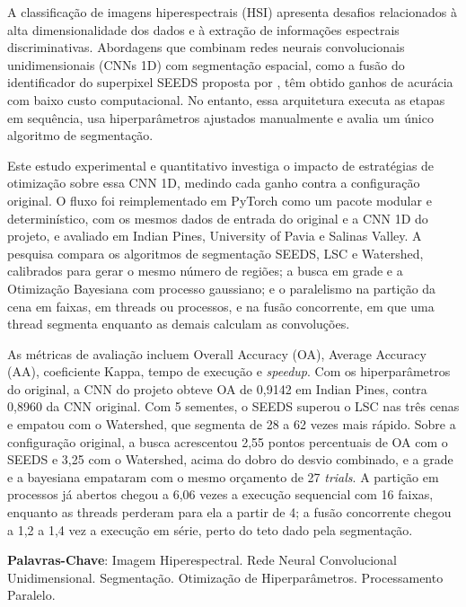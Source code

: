 \begin{Resumo}
A classificação de imagens hiperespectrais (HSI) apresenta desafios relacionados à alta dimensionalidade dos dados e à extração de informações espectrais discriminativas. Abordagens que combinam redes neurais convolucionais unidimensionais (CNNs 1D) com segmentação espacial, como a fusão do identificador do superpixel SEEDS proposta por , têm obtido ganhos de acurácia com baixo custo computacional. No entanto, essa arquitetura executa as etapas em sequência, usa hiperparâmetros ajustados manualmente e avalia um único algoritmo de segmentação.

Este estudo experimental e quantitativo investiga o impacto de estratégias de otimização sobre essa CNN 1D, medindo cada ganho contra a configuração original. O fluxo foi reimplementado em PyTorch como um pacote modular e determinístico, com os mesmos dados de entrada do original e a CNN 1D do projeto, e avaliado em Indian Pines, University of Pavia e Salinas Valley. A pesquisa compara os algoritmos de segmentação SEEDS, LSC e Watershed, calibrados para gerar o mesmo número de regiões; a busca em grade e a Otimização Bayesiana com processo gaussiano; e o paralelismo na partição da cena em faixas, em threads ou processos, e na fusão concorrente, em que uma thread segmenta enquanto as demais calculam as convoluções.

As métricas de avaliação incluem Overall Accuracy (OA), Average Accuracy (AA), coeficiente Kappa, tempo de execução e \textit{speedup}. Com os hiperparâmetros do original, a CNN do projeto obteve OA de 0,9142 em Indian Pines, contra 0,8960 da CNN original. Com 5 sementes, o SEEDS superou o LSC nas três cenas e empatou com o Watershed, que segmenta de 28 a 62 vezes mais rápido. Sobre a configuração original, a busca acrescentou 2,55 pontos percentuais de OA com o SEEDS e 3,25 com o Watershed, acima do dobro do desvio combinado, e a grade e a bayesiana empataram com o mesmo orçamento de 27 \textit{trials}. A partição em processos já abertos chegou a 6,06 vezes a execução sequencial com 16 faixas, enquanto as threads perderam para ela a partir de 4; a fusão concorrente chegou a 1,2 a 1,4 vez a execução em série, perto do teto dado pela segmentação.

\textbf{Palavras-Chave}: Imagem Hiperespectral. Rede Neural Convolucional Unidimensional. Segmentação. Otimização de Hiperparâmetros. Processamento Paralelo.
\end{Resumo}

